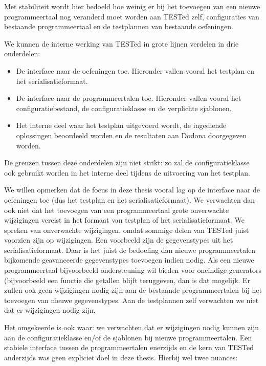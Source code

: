 Met stabiliteit wordt hier bedoeld hoe weinig er bij het toevoegen van een nieuwe programmeertaal nog veranderd moet worden aan TESTed zelf, configuraties van bestaande programmeertaal en de testplannen van bestaande oefeningen.

We kunnen de interne werking van TESTed in grote lijnen verdelen in drie onderdelen:

\begin{itemize}
    \item De interface naar de oefeningen toe.
    Hieronder vallen vooral het testplan en het serialisatieformaat.
    \item De interface naar de programmeertalen toe.
    Hieronder vallen vooral het configuratiebestand, de configuratieklasse en de verplichte sjablonen.
    \item Het interne deel waar het testplan uitgevoerd wordt, de ingediende oplossingen beoordeeld worden en de resultaten aan Dodona doorgegeven worden.
\end{itemize}

De grenzen tussen deze onderdelen zijn niet strikt: zo zal de configuratieklasse ook gebruikt worden in het interne deel tijdens de uitvoering van het testplan.

We willen opmerken dat de focus in deze thesis vooral lag op de interface naar de oefeningen toe (dus het testplan en het serialisatieformaat).
We verwachten dan ook niet dat het toevoegen van een programmeertaal grote onverwachte wijzigingen vereist in het formaat van testplan of het serialisatieformaat.
We spreken van onverwachte wijzigingen, omdat sommige delen van TESTed juist voorzien zijn op wijzigingen.
Een voorbeeld zijn de gegevenstypes uit het serialisatieformaat.
Daar is het juist de bedoeling dan nieuwe programmeertalen bijkomende geavanceerde gegevenstypes toevoegen indien nodig.
Als een nieuwe programmeertaal bijvoorbeeld ondersteuning wil bieden voor oneindige generators (bijvoorbeeld een functie die getallen blijft teruggeven, dan is dat mogelijk.
Er zullen ook geen wijzigingen nodig zijn aan de bestaande programmeertalen bij het toevoegen van nieuwe gegevenstypes.
Aan de testplannen zelf verwachten we niet dat er wijzigingen nodig zijn.

Het omgekeerde is ook waar: we verwachten dat er wijzigingen nodig kunnen zijn aan de configuratieklasse en/of de sjablonen bij nieuwe programmeertalen.
Een stabiele interface tussen de programmeertalen enerzijds en de kern van TESTed anderzijds was geen expliciet doel in deze thesis.
Hierbij wel twee nuances:

